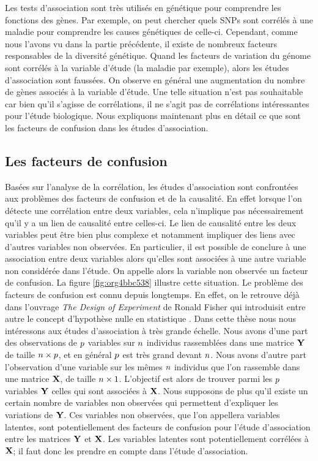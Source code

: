 \documentclass[12pt,a4paper,twoside]{ugathesis}
\begin{document}
Les tests d'association sont très utilisés en génétique pour comprendre les
fonctions des gènes. Par exemple, on peut chercher quels SNPs sont corrélés à
une maladie pour comprendre les causes génétiques de celle-ci. Cependant, comme
nous l'avons vu dans la partie précédente, il existe de nombreux facteurs
responsables de la diversité génétique. Quand les facteurs de variation du
génome sont corrélés à la variable d'étude (la maladie par exemple), alors les
études d'association sont faussées. On observe en général une augmentation du
nombre de gènes associés à la variable d'étude. Une telle situation n'est pas
souhaitable car bien qu'il s'agisse de corrélations, il ne s'agit pas de
corrélations intéressantes pour l'étude biologique. Nous expliquons maintenant
plus en détail ce que sont les facteurs de confusion dans les études
d'association.

\subsection{Les facteurs de confusion}
\label{sec:org78f8559}
\label{orgd48b945}

Basées sur l'analyse de la corrélation, les études d'association sont
confrontées aux problèmes des facteurs de confusion et de la causalité. En effet
lorsque l'on détecte une corrélation entre deux variables, cela n'implique pas
nécessairement qu'il y a un lien de causalité entre celles-ci. Le lien de
causalité entre les deux variables peut être bien plus complexe et notamment
impliquer des liens avec d'autres variables non observées. En particulier, il
est possible de conclure à une association entre deux variables alors qu'elles
sont associées à une autre variable non considérée dans l'étude. On appelle
alors la variable non observée un facteur de confusion. La figure
\ref{fig:org4bbc538} illustre cette situation. Le problème des facteurs de
confusion est connu depuis longtemps. En effet, on le retrouve déjà dans
l'ouvrage \emph{The Design of Experiment} de Ronald Fisher qui introduisit entre
autre le concept d'hypothèse nulle en statistique \citep{fisher1937design}. Dans
cette thèse nous nous intéressons aux études d'association à très grande
échelle. Nous avons d'une part des observations de \(p\) variables sur \(n\)
individus rassemblées dans une matrice \(\mathbf{Y}\) de taille \(n \times p\), et
en général \(p\) est très grand devant \(n\). Nous avons d'autre part
l'observation d'une variable sur les mêmes \(n\) individus que l'on rassemble
dans une matrice \(\mathbf{X}\), de taille \(n \times 1\). L'objectif est alors de
trouver parmi les \(p\) variables \(\mathbf{Y}\) celles qui sont associées à \(\mathbf{X}\). Nous
supposons de plus qu'il existe un certain nombre de variables non observées qui
permettent d'expliquer les variations de \(\mathbf{Y}\). Ces variables non observées, que
l'on appellera variables latentes, sont potentiellement des facteurs de
confusion pour l'étude d'association entre les matrices \(\mathbf{Y}\) et \(\mathbf{X}\). Les
variables latentes sont potentiellement corrélées à \(\mathbf{X}\); il faut donc les
prendre en compte dans l'étude d'association.
\end{document}
